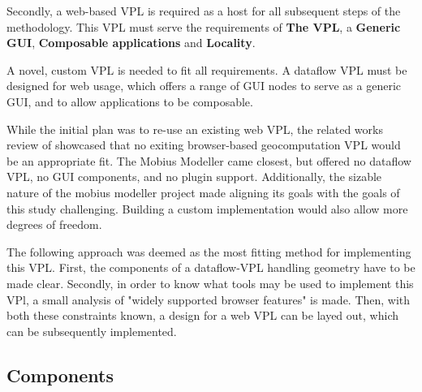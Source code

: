 Secondly, a web-based VPL is required as a host for all subsequent steps of the methodology. 
This VPL must serve the requirements of \textbf{The VPL}, a \textbf{Generic GUI}, \textbf{Composable applications} and \textbf{Locality}.

A novel, custom VPL is needed to fit all requirements. 
A dataflow VPL must be designed for web usage, which offers a range of \ac{GUI} nodes to serve as a generic GUI, and to allow applications to be composable. 

While the initial plan was to re-use an existing web VPL, the related works review of  showcased that no exiting browser-based geocomputation VPL would be an appropriate fit.
The Mobius Modeller \citep{janssen_mobius_2021} came closest, but offered no dataflow VPL, no GUI components, and no plugin support. 
Additionally, the sizable nature of the mobius modeller project made aligning its goals with the goals of this study challenging. 
Building a custom implementation would also allow more degrees of freedom.

The following approach was deemed as the most fitting method for implementing this VPL. 
First, the components of a dataflow-VPL handling geometry have to be made clear.
Secondly, in order to know what tools may be used to implement this VPl, a small analysis of "widely supported browser features" is made. 
Then, with both these constraints known, a design for a web VPL can be layed out, which can be subsequently implemented. 

\subsection{Components}

